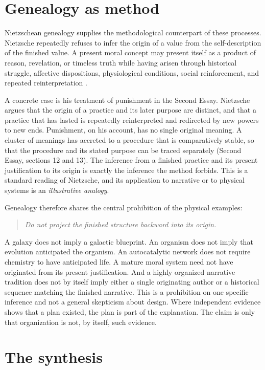 \documentclass[11pt]{article}
\newenvironment{principle}{\begin{quote}\itshape}{\end{quote}}
\begin{document}
\section{Genealogy as method}

Nietzschean genealogy supplies the methodological counterpart of these processes. Nietzsche repeatedly refuses to infer the origin of a value from the self-description of the finished value. A present moral concept may present itself as a product of reason, revelation, or timeless truth while having arisen through historical struggle, affective dispositions, physiological conditions, social reinforcement, and repeated reinterpretation \cite{nietzsche}.

A concrete case is his treatment of punishment in the Second Essay. Nietzsche argues that the origin of a practice and its later purpose are distinct, and that a practice that has lasted is repeatedly reinterpreted and redirected by new powers to new ends. Punishment, on his account, has no single original meaning. A cluster of meanings has accreted to a procedure that is comparatively stable, so that the procedure and its stated purpose can be traced separately (Second Essay, sections 12 and 13). The inference from a finished practice and its present justification to its origin is exactly the inference the method forbids. This is a standard reading of Nietzsche, and its application to narrative or to physical systems is an \emph{illustrative analogy}.

Genealogy therefore shares the central prohibition of the physical examples:
\begin{principle}
Do not project the finished structure backward into its origin.
\end{principle}

A galaxy does not imply a galactic blueprint. An organism does not imply that evolution anticipated the organism. An autocatalytic network does not require chemistry to have anticipated life. A mature moral system need not have originated from its present justification. And a highly organized narrative tradition does not by itself imply either a single originating author or a historical sequence matching the finished narrative. This is a prohibition on one specific inference and not a general skepticism about design. Where independent evidence shows that a plan existed, the plan is part of the explanation. The claim is only that organization is not, by itself, such evidence.

\section{The synthesis}
\end{document}
